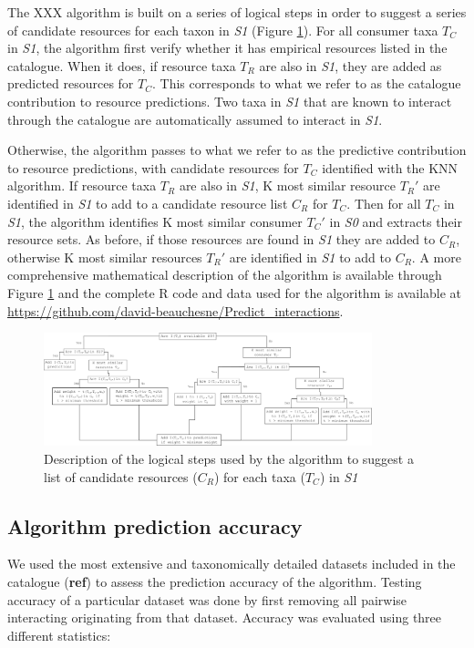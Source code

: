 \documentclass[letterpaper]{article}
\begin{document}
The XXX algorithm is built on a series of logical steps in order to suggest a series of candidate resources for each taxon in \textit{S1} (Figure \ref{fig:decision_diag}). For all consumer taxa $T_C$ in \textit{S1}, the algorithm first verify whether it has empirical resources listed in the catalogue. When it does, if resource taxa $T_R$ are also in \textit{S1}, they are added as predicted resources for $T_C$. This corresponds to what we refer to as the catalogue contribution to resource predictions. Two taxa in \textit{S1} that are known to interact through the catalogue are automatically assumed to interact in \textit{S1}.

Otherwise, the algorithm passes to what we refer to as the predictive contribution to resource predictions, with candidate resources for $T_C$ identified with the KNN algorithm. If resource taxa $T_R$ are also in \textit{S1}, K most similar resource $T_R'$ are identified in \textit{S1} to add to a candidate resource list $C_R$ for $T_C$. Then for all $T_C$ in \textit{S1}, the algorithm identifies K most similar consumer $T_C'$ in \textit{S0} and extracts their resource sets. As before, if those resources are found in \textit{S1} they are added to $C_R$, otherwise K most similar resources $T_R'$ are identified in \textit{S1} to add to $C_R$. A more comprehensive mathematical description of the algorithm is available through Figure \ref{fig:decision_diag} and the complete R code and data used for the algorithm is available at \href{https://github.com/david-beauchesne/Predict_interactions}{https://github.com/david-beauchesne/Predict\_interactions}.

        \begin{figure}[h]
          \centering\includegraphics[width=0.85\textwidth]{Decision_Diagram.png}
          \caption{Description of the logical steps used by the algorithm to suggest a list of candidate resources ($C_R$) for each taxa ($T_C$) in \textit{S1}}
          \label{fig:decision_diag}
        \end{figure}

\subsection{Algorithm prediction accuracy}
We used the most extensive and taxonomically detailed datasets included in the catalogue (\textbf{ref}) to assess the prediction accuracy of the algorithm. Testing accuracy of a particular dataset was done by first removing all pairwise interacting originating from that dataset. Accuracy was evaluated using three different statistics:
\end{document}
